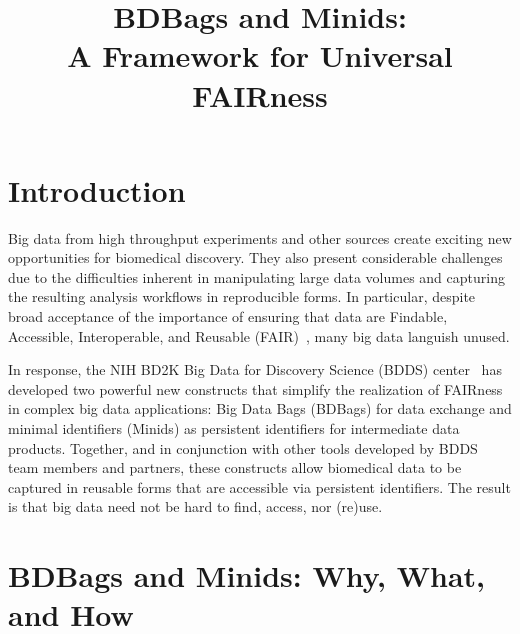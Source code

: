 \documentclass[11pt]{article}
\title{BDBags and Minids:\\A Framework for Universal FAIRness}
\author{}
\date{}
\begin{document}
\maketitle


\section{Introduction}

Big data from high throughput experiments and other sources create exciting new opportunities for biomedical discovery. 
They also present considerable challenges %
due to the difficulties inherent in manipulating large data volumes and capturing the resulting analysis workflows in reproducible forms.
In particular, despite broad acceptance of the importance of ensuring that data are
Findable, Accessible, Interoperable, and Reusable (FAIR)~\cite{wilkinson16},
many big data languish unused. 

In response, the NIH BD2K Big Data for Discovery Science (BDDS) center~\cite{toga15}
has developed two powerful new constructs that simplify the realization of FAIRness in 
complex big data applications: Big Data Bags (BDBags) for data exchange and 
minimal identifiers (Minids) as persistent identifiers for intermediate data products.
Together, and in conjunction with other tools developed by BDDS team members and partners,
these constructs allow biomedical data to be captured in reusable forms that are accessible via persistent identifiers. 
The result is that big data need not be hard to find, access, nor (re)use. 

\section{BDBags and Minids: Why, What, and How}
\end{document}
